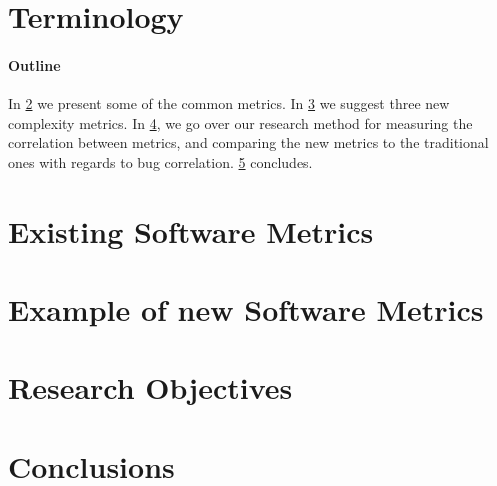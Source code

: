 \documentclass[10pt,twocolumn]{article}
\author{Tome Levy\\
	Department of Computer Science\\
	Technion---Israel Institute of Technology\\
	\texttt{\small \href{mailto:liorsam@campus.Technion.ac.il}{liorsam@campus.Technion.ac.il}}}
\date{\small Advisor: Prof.\ Yossi Gil}
\begin{document}
\maketitle
  
\begin{abstract}
	 
\end{abstract}

\section{Terminology}


\paragraph{Outline} 
In \cref{Section:metrics} we present some of the common metrics.
In \cref{Section:new-metrics} we suggest three new complexity metrics.
In \cref{Section:objectives}, we go over our research method for measuring
the correlation between metrics, and comparing the new metrics to the
traditional ones with regards to bug correlation.
\cref{Section:zz} concludes. 

\section{Existing Software Metrics}
\label{Section:metrics}
%

\section{Example of new Software Metrics}
\label{Section:new-metrics}
% 

\section{Research Objectives}
\label{Section:objectives}
%

\section{Conclusions}
\label{Section:zz}



%

\end{document}
